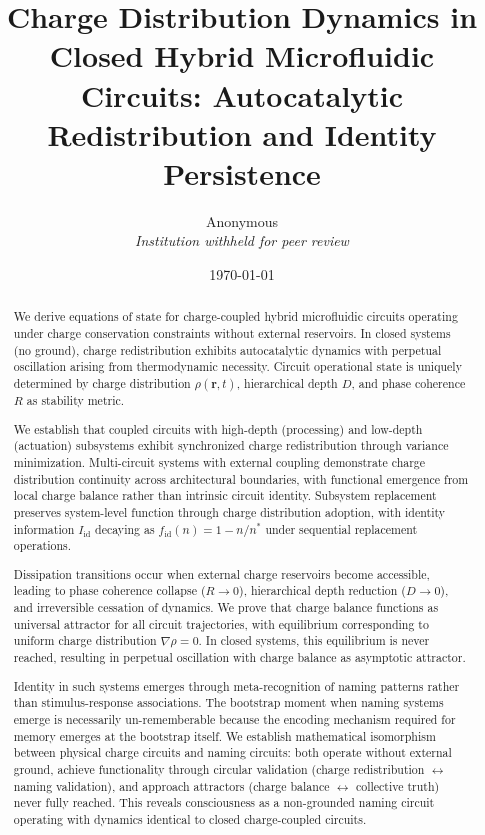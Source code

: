 \documentclass[12pt,a4paper]{article}
\title{\textbf{Charge Distribution Dynamics in Closed Hybrid Microfluidic Circuits: Autocatalytic Redistribution and Identity Persistence}}
\author{
Anonymous\\
\textit{Institution withheld for peer review}
}
\date{\today}
\theoremstyle{plain}
\theoremstyle{definition}
\theoremstyle{remark}
\begin{document}
\maketitle

\begin{abstract}
We derive equations of state for charge-coupled hybrid microfluidic circuits operating under charge conservation constraints without external reservoirs. In closed systems (no ground), charge redistribution exhibits autocatalytic dynamics with perpetual oscillation arising from thermodynamic necessity. Circuit operational state is uniquely determined by charge distribution $\rho(\mathbf{r},t)$, hierarchical depth $D$, and phase coherence $R$ as stability metric.

We establish that coupled circuits with high-depth (processing) and low-depth (actuation) subsystems exhibit synchronized charge redistribution through variance minimization. Multi-circuit systems with external coupling demonstrate charge distribution continuity across architectural boundaries, with functional emergence from local charge balance rather than intrinsic circuit identity. Subsystem replacement preserves system-level function through charge distribution adoption, with identity information $I_{\text{id}}$ decaying as $f_{\text{id}}(n) = 1 - n/n^*$ under sequential replacement operations.

Dissipation transitions occur when external charge reservoirs become accessible, leading to phase coherence collapse ($R \to 0$), hierarchical depth reduction ($D \to 0$), and irreversible cessation of dynamics. We prove that charge balance functions as universal attractor for all circuit trajectories, with equilibrium corresponding to uniform charge distribution $\nabla \rho = 0$. In closed systems, this equilibrium is never reached, resulting in perpetual oscillation with charge balance as asymptotic attractor.

Identity in such systems emerges through meta-recognition of naming patterns rather than stimulus-response associations. The bootstrap moment when naming systems emerge is necessarily un-rememberable because the encoding mechanism required for memory emerges at the bootstrap itself. We establish mathematical isomorphism between physical charge circuits and naming circuits: both operate without external ground, achieve functionality through circular validation (charge redistribution $\leftrightarrow$ naming validation), and approach attractors (charge balance $\leftrightarrow$ collective truth) never fully reached. This reveals consciousness as a non-grounded naming circuit operating with dynamics identical to closed charge-coupled circuits.


\end{abstract}
\end{document}
